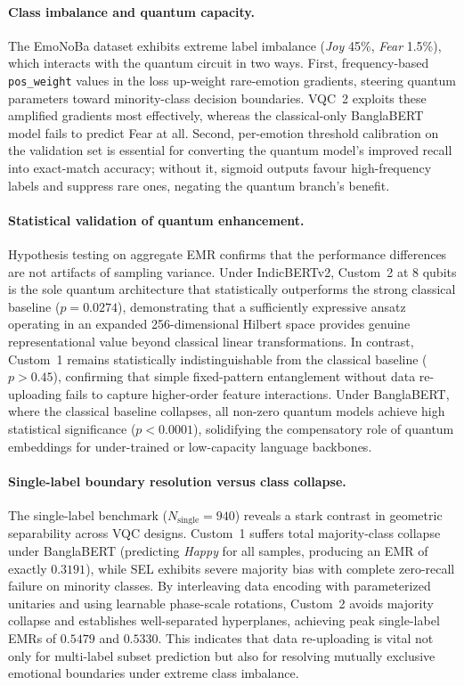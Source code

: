 \documentclass[runningheads]{llncs}
\begin{document}
\paragraph{Class imbalance and quantum capacity.}
The EmoNoBa dataset exhibits extreme label imbalance (\emph{Joy} 45\%, \emph{Fear} 1.5\%), which interacts with the quantum circuit in two ways. First, frequency-based \texttt{pos\_weight} values in the loss up-weight rare-emotion gradients, steering quantum parameters toward minority-class decision boundaries. VQC~2 exploits these amplified gradients most effectively, whereas the classical-only BanglaBERT model fails to predict Fear at all. Second, per-emotion threshold calibration on the validation set is essential for converting the quantum model's improved recall into exact-match accuracy; without it, sigmoid outputs favour high-frequency labels and suppress rare ones, negating the quantum branch's benefit.

\paragraph{Statistical validation of quantum enhancement.}
Hypothesis testing on aggregate EMR confirms that the performance differences are not artifacts of sampling variance. Under IndicBERTv2, Custom~2 at 8 qubits is the sole quantum architecture that statistically outperforms the strong classical baseline ($p = 0.0274$), demonstrating that a sufficiently expressive ansatz operating in an expanded 256-dimensional Hilbert space provides genuine representational value beyond classical linear transformations. In contrast, Custom~1 remains statistically indistinguishable from the classical baseline ($p > 0.45$), confirming that simple fixed-pattern entanglement without data re-uploading fails to capture higher-order feature interactions. Under BanglaBERT, where the classical baseline collapses, all non-zero quantum models achieve high statistical significance ($p < 0.0001$), solidifying the compensatory role of quantum embeddings for under-trained or low-capacity language backbones.

\paragraph{Single-label boundary resolution versus class collapse.}
The single-label benchmark ($N_{\text{single}} = 940$) reveals a stark contrast in geometric separability across VQC designs. Custom~1 suffers total majority-class collapse under BanglaBERT (predicting \emph{Happy} for all samples, producing an EMR of exactly $0.3191$), while SEL exhibits severe majority bias with complete zero-recall failure on minority classes. By interleaving data encoding with parameterized unitaries and using learnable phase-scale rotations, Custom~2 avoids majority collapse and establishes well-separated hyperplanes, achieving peak single-label EMRs of $0.5479$ and $0.5330$. This indicates that data re-uploading is vital not only for multi-label subset prediction but also for resolving mutually exclusive emotional boundaries under extreme class imbalance.
\end{document}

